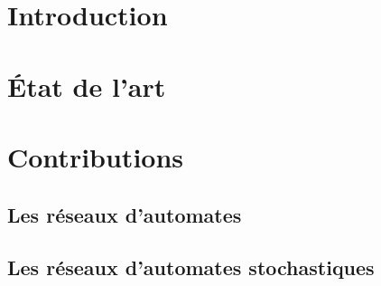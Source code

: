 \documentclass[fleqn,10pt,c]{beamer}
\begin{document}
%
%



%


%
%



\section{Introduction}

\section{\'Etat de l'art}


 
 
 \section{Contributions}
 
% 
 \subsection{Les réseaux d'automates}
 
 
 \subsection{Les réseaux d'automates stochastiques}
 

\end{document}
